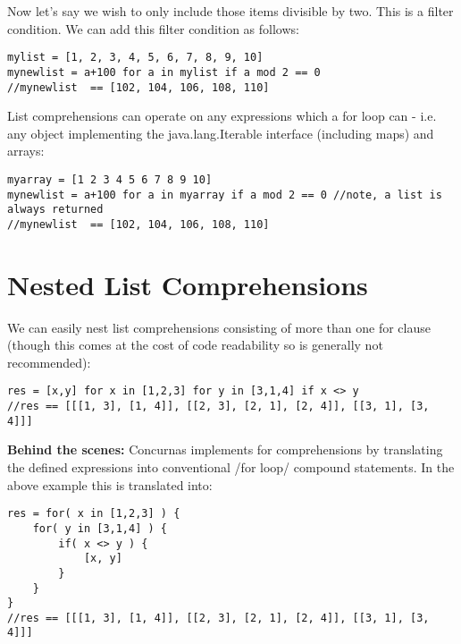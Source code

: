 \documentclass[conc-doc]{subfiles}
\begin{document}
Now let's say we wish to only include those items divisible by two. This is a filter condition. We can add this filter condition as follows:
\begin{lstlisting}
mylist = [1, 2, 3, 4, 5, 6, 7, 8, 9, 10]
mynewlist = a+100 for a in mylist if a mod 2 == 0
//mynewlist  == [102, 104, 106, 108, 110]
\end{lstlisting}

List comprehensions can operate on any expressions which a for loop can - i.e. any object implementing the java.lang.Iterable interface (including maps) and arrays:
\begin{lstlisting}
myarray = [1 2 3 4 5 6 7 8 9 10]
mynewlist = a+100 for a in myarray if a mod 2 == 0 //note, a list is always returned
//mynewlist  == [102, 104, 106, 108, 110]
\end{lstlisting}

\section{Nested List Comprehensions}
We can easily nest list comprehensions consisting of more than one for clause (though this comes at the cost of code readability so is generally not recommended):
\begin{lstlisting}
res = [x,y] for x in [1,2,3] for y in [3,1,4] if x <> y
//res == [[[1, 3], [1, 4]], [[2, 3], [2, 1], [2, 4]], [[3, 1], [3, 4]]]
\end{lstlisting}

\textbf{Behind the scenes:} Concurnas implements for comprehensions by translating the defined expressions into  conventional /for loop/ compound statements. In the above example this is translated into:
\begin{lstlisting}
res = for( x in [1,2,3] ) {
	for( y in [3,1,4] ) {
		if( x <> y ) {	
			[x, y]
		}
	}
}
//res == [[[1, 3], [1, 4]], [[2, 3], [2, 1], [2, 4]], [[3, 1], [3, 4]]]
\end{lstlisting}
\end{document}

